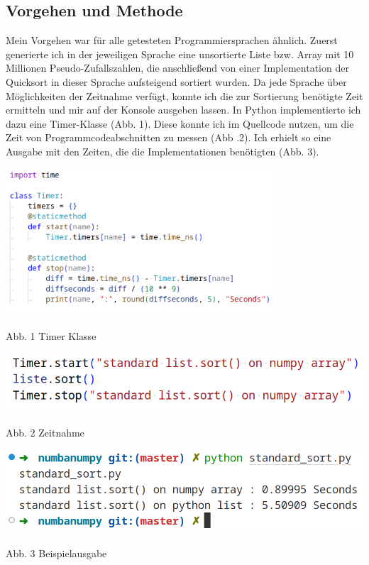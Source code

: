 \documentclass[11pt,a4paper]{article}
\begin{document}
\subsection{Vorgehen und Methode}

Mein Vorgehen war für alle getesteten Programmiersprachen ähnlich.
Zuerst generierte ich in der jeweiligen Sprache eine unsortierte Liste bzw. Array mit 10 Millionen Pseudo-Zufallszahlen,
die anschließend von einer Implementation der Quicksort in dieser Sprache aufsteigend sortiert wurden.
Da jede Sprache über Möglichkeiten der Zeitnahme verfügt, konnte ich die zur Sortierung benötigte Zeit
ermitteln und mir auf der Konsole ausgeben lassen. In Python implementierte ich dazu eine Timer-Klasse
(Abb. 1). Diese konnte ich im Quellcode nutzen, um die Zeit von Programmcodeabschnitten zu messen (Abb .2).
Ich erhielt so eine Ausgabe mit den Zeiten, die die Implementationen benötigten (Abb. 3).

\begin{center}
    \includegraphics[width=0.75\textwidth]{screenshots/pythontimerlight.png}

    Abb. 1 Timer Klasse
\end{center}

\begin{center}
    \includegraphics[width=.75\textwidth]{screenshots/timerexamplelight.png}

    Abb. 2 Zeitnahme

    \includegraphics[width=.75\textwidth]{screenshots/outputexamplelight.png}

    Abb. 3 Beispielausgabe
\end{center}
\end{document}
